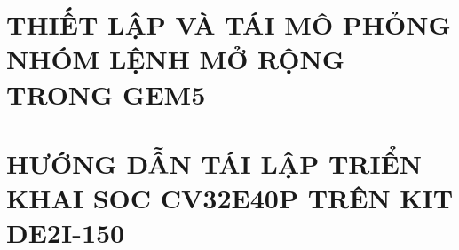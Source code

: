 \documentclass[a4paper,twoside]{report}
\theoremstyle{definition}
\begin{document}
% 

\newpage
\chapter[TÁI MÔ PHỎNG TRONG GEM5]{THIẾT LẬP VÀ TÁI MÔ PHỎNG NHÓM LỆNH MỞ RỘNG TRONG GEM5}
\label{app:gem5-tai-mo-phong}


\newpage
\chapter[TRIỂN KHAI SOC CV32E40P TRÊN KIT DE2I-150]{HƯỚNG DẪN TÁI LẬP TRIỂN KHAI SOC CV32E40P TRÊN KIT DE2I-150}
\label{app:soc-trien-khai}

\end{document}
